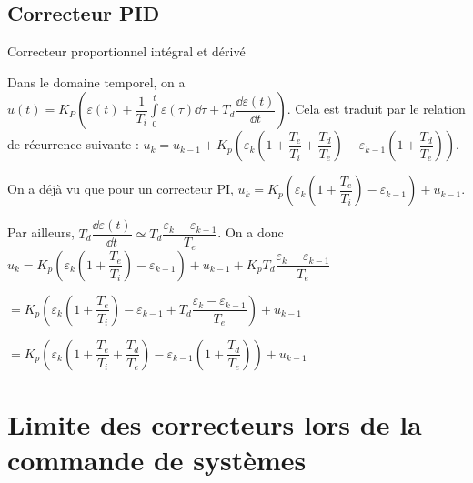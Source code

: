 \subsection{Correcteur PID}
\begin{defi}{Correcteur proportionnel intégral et dérivé}

Dans le domaine temporel, on a $u(t)=K_P  \left(\varepsilon(t)+\dfrac{1}{T_i}\int\limits_0^t \varepsilon(\tau) \dd \tau +T_d \dfrac{\dd \varepsilon(t)}{\dd t}\right)$. Cela est traduit par le relation de récurrence suivante : 
$u_k = u_{k-1} + K_p \left( \varepsilon_k \left( 1+\dfrac{T_e}{T_i}+\dfrac{T_d}{T_e}\right) - \varepsilon_{k-1} \left( 1+\dfrac{T_d}{T_e}\right)\right)$.

\end{defi}

\begin{demo}
On a déjà vu que pour un correcteur PI, $u_k = K_p\left(\varepsilon_k \left(1+\dfrac{T_e}{T_i}\right) - \varepsilon_{k-1}\right) + u_{k-1} $.

Par ailleurs, $T_d  \dfrac{\dd \varepsilon(t)}{\dd t} \simeq T_d  \dfrac{\varepsilon_k -\varepsilon_{k-1}}{T_e}$. 
On a donc 
 $u_k = K_p\left(\varepsilon_k \left(1+\dfrac{T_e}{T_i}\right) - \varepsilon_{k-1}\right) + u_{k-1}  + K_p  T_d  \dfrac{\varepsilon_k -\varepsilon_{k-1}}{T_e} $
 

$= K_p\left(\varepsilon_k \left(1+\dfrac{T_e}{T_i}\right) - \varepsilon_{k-1} +  T_d  \dfrac{\varepsilon_k -\varepsilon_{k-1}}{T_e}\right) + u_{k-1}   $

$= K_p\left(\varepsilon_k \left(1+\dfrac{T_e}{T_i}+\dfrac{T_d}{T_e}\right) - \varepsilon_{k-1}\left( 1+\dfrac{T_d}{T_e}\right) \right) + u_{k-1}   $

\end{demo}


\section{Limite des correcteurs lors de la commande de systèmes}

\begin{thebibliography}{2}
\end{thebibliography}





